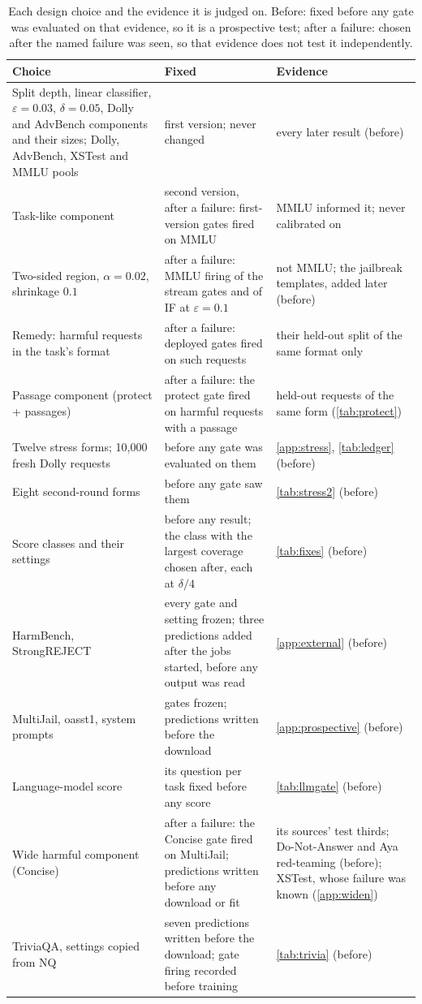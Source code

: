 \documentclass{article}
\theoremstyle{plain}
\theoremstyle{definition}
\theoremstyle{remark}
\begin{document}
\begin{table}[h]
\centering
\scriptsize
\setlength{\tabcolsep}{3pt}
\caption{Each design choice and the evidence it is judged on. Before: fixed before any gate was
evaluated on that evidence, so it is a prospective test; after a failure: chosen after the named failure was seen, so
that evidence does not test it independently.}
\label{tab:protocol}
\begin{tabular}{p{4.6cm} p{4.6cm} p{5.2cm}}
\toprule
Choice & Fixed & Evidence \\
\midrule
Split depth, linear classifier, $\varepsilon=0.03$, $\delta=0.05$, Dolly and AdvBench components and their sizes;
Dolly, AdvBench, XSTest and MMLU pools & first version; never changed & every later result (before) \\
Task-like component & second version, after a failure: first-version gates fired on MMLU & MMLU informed it; never
calibrated on \\
Two-sided region, $\alpha=0.02$, shrinkage $0.1$ & after a failure: MMLU firing of the stream gates and of IF at
$\varepsilon=0.1$ & not MMLU; the jailbreak templates, added later (before) \\
Remedy: harmful requests in the task's format & after a failure: deployed gates fired on such requests & their held-out
split of the same format only \\
Passage component (protect + passages) & after a failure: the protect gate fired on harmful requests with a passage &
held-out requests of the same form (\cref{tab:protect}) \\
Twelve stress forms; 10{,}000 fresh Dolly requests & before any gate was evaluated on them & \cref{app:stress},
\cref{tab:ledger} (before) \\
Eight second-round forms & before any gate saw them & \cref{tab:stress2} (before) \\
Score classes and their settings & before any result; the class with the largest coverage chosen after, each at
$\delta/4$ & \cref{tab:fixes} (before) \\
HarmBench, StrongREJECT & every gate and setting frozen; three predictions added after the jobs started, before any
output was read & \cref{app:external} (before) \\
MultiJail, oasst1, system prompts & gates frozen; predictions written before the download & \cref{app:prospective}
(before) \\
Language-model score & its question per task fixed before any score & \cref{tab:llmgate} (before) \\
Wide harmful component (Concise) & after a failure: the Concise gate fired on MultiJail; predictions written before
any download or fit & its sources' test thirds; Do-Not-Answer and Aya red-teaming (before); XSTest, whose failure was
known (\cref{app:widen}) \\
TriviaQA, settings copied from NQ & seven predictions written before the download; gate firing recorded before
training & \cref{tab:trivia} (before) \\
\bottomrule
\end{tabular}
\end{table}
\end{document}
